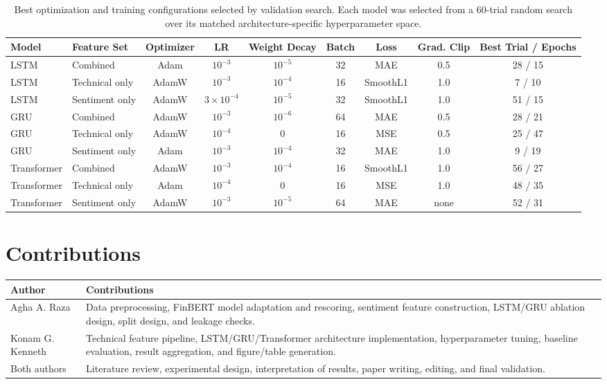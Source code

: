 \documentclass[10pt,twocolumn]{article}
\begin{document}
\begin{table}[t]
\centering
\scriptsize
\begin{tabular}{llccccccc}
\toprule
Model & Feature Set & Optimizer & LR & Weight Decay & Batch & Loss & Grad. Clip & Best Trial / Epochs \\
\midrule
LSTM & Combined & Adam & $10^{-3}$ & $10^{-5}$ & 32 & MAE & 0.5 & 28 / 15 \\
LSTM & Technical only & AdamW & $10^{-3}$ & $10^{-4}$ & 16 & SmoothL1 & 1.0 & 7 / 10 \\
LSTM & Sentiment only & AdamW & $3\times10^{-4}$ & $10^{-5}$ & 32 & SmoothL1 & 1.0 & 51 / 15 \\
GRU & Combined & AdamW & $10^{-3}$ & $10^{-6}$ & 64 & MAE & 0.5 & 28 / 21 \\
GRU & Technical only & AdamW & $10^{-4}$ & 0 & 16 & MSE & 0.5 & 25 / 47 \\
GRU & Sentiment only & Adam & $10^{-3}$ & $10^{-4}$ & 32 & MAE & 1.0 & 9 / 19 \\
Transformer & Combined & AdamW & $10^{-3}$ & $10^{-4}$ & 16 & SmoothL1 & 1.0 & 56 / 27 \\
Transformer & Technical only & Adam & $10^{-4}$ & 0 & 16 & MSE & 1.0 & 48 / 35 \\
Transformer & Sentiment only & AdamW & $10^{-3}$ & $10^{-5}$ & 64 & MAE & none & 52 / 31 \\
\bottomrule
\end{tabular}
\caption{Best optimization and training configurations selected by validation search. Each model was selected from a 60-trial random search over its matched architecture-specific hyperparameter space.}
\end{table}

\section{Contributions}

\begin{center}
\small
\begin{tabular}{p{}p{}}
\toprule
Author & Contributions \\
\midrule
Agha A. Raza & Data preprocessing, FinBERT model adaptation and rescoring, sentiment feature construction, LSTM/GRU ablation design, split design, and leakage checks. \\
Konam G. Kenneth & Technical feature pipeline, LSTM/GRU/Transformer architecture implementation, hyperparameter tuning, baseline evaluation, result aggregation, and figure/table generation. \\
\midrule
Both authors & Literature review, experimental design, interpretation of results, paper writing, editing, and final validation. \\
\bottomrule
\end{tabular}
\end{center}
\end{document}
